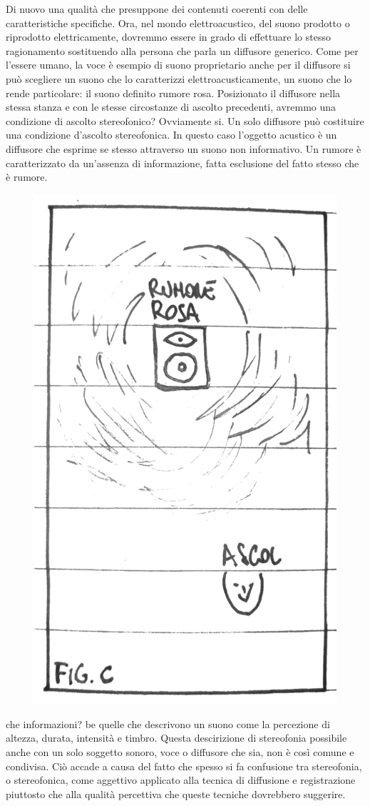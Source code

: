 Di nuovo una qualità che presuppone dei contenuti coerenti con delle
caratteristiche specifiche. Ora, nel mondo elettroacustico, del suono prodotto
o riprodotto elettricamente, dovremmo essere in grado di effettuare lo stesso
ragionamento sostituendo alla persona che parla un diffusore generico. Come per
l'essere umano, la voce è esempio di suono proprietario anche per il diffusore
si può scegliere un suono che lo caratterizzi elettroacusticamente, un suono
che lo rende particolare: il suono definito rumore rosa. Posizionato il diffusore
nella stessa stanza e con le stesse circostanze di ascolto precedenti, avremmo
una condizione di ascolto stereofonico? Ovviamente si. Un solo diffusore può
costituire una condizione d'ascolto stereofonica. In questo caso l'oggetto
acustico è un diffusore che esprime se stesso attraverso un suono non informativo.
Un rumore è caratterizzato da un'assenza di informazione, fatta esclusione del
fatto stesso che è rumore.

\begin{figure}[h]
\begin{center}
  \includegraphics[width=.48\linewidth]{CAPITOLI/1000/IMG/figc.png}
\label{ee:figc}
\end{center}
\end{figure}

che informazioni? be quelle che descrivono un suono come la percezione di altezza,
durata, intensità e timbro. Questa descirizione di stereofonia possibile anche
con un solo soggetto sonoro, voce o diffusore che sia, non è così comune e
condivisa. Ciò accade a causa del fatto che spesso si fa confusione tra stereofonia,
o stereofonica, come aggettivo applicato alla tecnica di diffusione e registrazione
piuttosto che alla qualità percettiva che queste tecniche dovrebbero suggerire.

